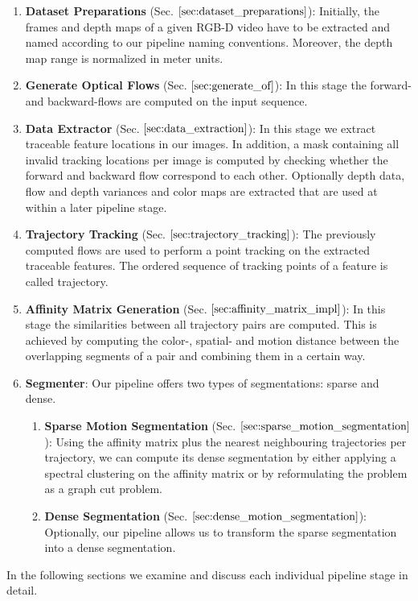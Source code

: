 \begin{enumerate}
\item \textbf{Dataset Preparations} (Sec. $\ref{sec:dataset_preparations}$): Initially, the frames and depth maps of a given RGB-D video have to be extracted and named according to our pipeline naming conventions. Moreover, the depth map range is normalized in meter units.
\item \textbf{Generate Optical Flows} (Sec. $\ref{sec:generate_of}$): In this stage the forward- and backward-flows are computed on the input sequence.
\item \textbf{Data Extractor} (Sec. $\ref{sec:data_extraction}$): In this stage we extract traceable feature locations in our images. In addition, a mask containing all invalid tracking locations per image is computed by checking whether the forward and backward flow correspond to each other. Optionally depth data, flow and depth variances and color maps are extracted that are used at within a later pipeline stage. 
\item \textbf{Trajectory Tracking} (Sec. $\ref{sec:trajectory_tracking}$): The previously computed flows are used to perform a point tracking on the extracted traceable features. The ordered sequence of tracking points of a feature is called trajectory.
\item \textbf{Affinity Matrix Generation} (Sec. $\ref{sec:affinity_matrix_impl}$): In this stage the similarities between all trajectory pairs are computed. This is achieved by computing the color-, spatial- and motion distance between the overlapping segments of a pair and combining them in a certain way.
\item \textbf{Segmenter}: Our pipeline offers two types of segmentations: sparse and dense. 
	\begin{enumerate}
	\item \textbf{Sparse Motion Segmentation} (Sec. $\ref{sec:sparse_motion_segmentation}$): Using the affinity matrix plus the nearest neighbouring trajectories per trajectory, we can compute its dense segmentation by either applying a spectral clustering on the affinity matrix or by reformulating the problem as a graph cut problem. 
	\item \textbf{Dense Segmentation} (Sec. $\ref{sec:dense_motion_segmentation}$): Optionally, our pipeline allows us to transform the sparse segmentation into a dense segmentation. 	
	\end{enumerate}
\end{enumerate}
In the following sections we examine and discuss each individual pipeline stage in detail. 

